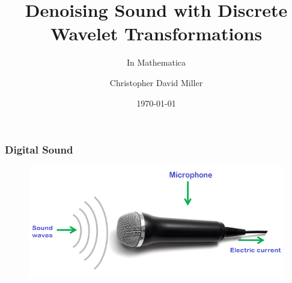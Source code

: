 \documentclass{beamer}
\title[Denoising Sound]{Denoising Sound with Discrete Wavelet Transformations}
\subtitle{In Mathematica}
\author{Christopher David Miller}
\institute{Allegheny College}
\date{\today}
\begin{document}
\begin{frame}
    \titlepage
\end{frame}
\begin{frame}
    \frametitle{Digital Sound}
    \begin{figure}
        \includegraphics[scale=.5]{soundModel.png}
    \end{figure}
\end{frame}
\end{document}
